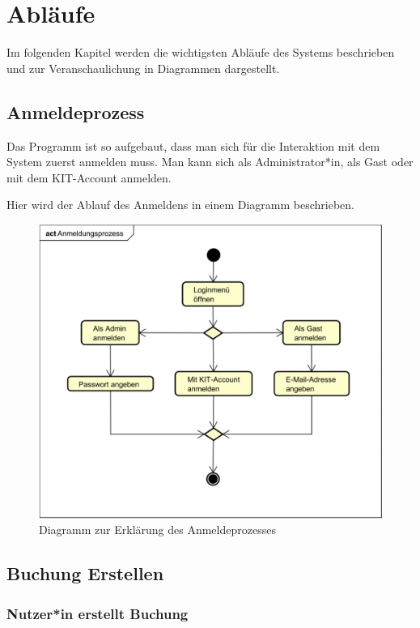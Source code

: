 
\chapter{Abläufe}
\label{ch:processes}
Im folgenden Kapitel werden die wichtigsten Abläufe des Systems beschrieben und zur Veranschaulichung in
Diagrammen dargestellt.

\section{Anmeldeprozess}
Das Programm ist so aufgebaut, dass man sich für die Interaktion mit dem System zuerst anmelden muss.
Man kann sich als Administrator*in, als Gast oder mit dem KIT-Account anmelden.

Hier wird der Ablauf des Anmeldens in einem Diagramm beschrieben.

\begin{figure}[ht]
    \centering
    \includegraphics[width=\textwidth]{figures/activity/anmeldeprozess}
    \caption{Diagramm zur Erklärung des Anmeldeprozesses}
    \label{fig:login-diagram}
\end{figure}
\clearpage

\section{Buchung Erstellen}

\subsection{Nutzer*in erstellt Buchung}

